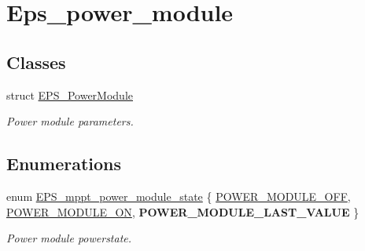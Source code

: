 \hypertarget{group__eps__power__module}{\section{Eps\-\_\-power\-\_\-module}
\label{group__eps__power__module}
}
\subsection*{Classes}
\begin{DoxyCompactItemize}
\item 
struct \hyperlink{struct_e_p_s___power_module}{E\-P\-S\-\_\-\-Power\-Module}
\begin{DoxyCompactList}\small\item\em Power module parameters. \end{DoxyCompactList}\end{DoxyCompactItemize}
\subsection*{Enumerations}
\begin{DoxyCompactItemize}
\item 
enum \hyperlink{group__eps__power__module_gadd75354311e873b06e0f85b643c5cea2}{E\-P\-S\-\_\-mppt\-\_\-power\-\_\-module\-\_\-state} \{ \hyperlink{group__eps__power__module_ggadd75354311e873b06e0f85b643c5cea2a736e356719d62059c975b07f1b4d24ef}{P\-O\-W\-E\-R\-\_\-\-M\-O\-D\-U\-L\-E\-\_\-\-O\-F\-F}, 
\hyperlink{group__eps__power__module_ggadd75354311e873b06e0f85b643c5cea2a577e74d24852a24295d63e50021704cd}{P\-O\-W\-E\-R\-\_\-\-M\-O\-D\-U\-L\-E\-\_\-\-O\-N}, 
{\bfseries P\-O\-W\-E\-R\-\_\-\-M\-O\-D\-U\-L\-E\-\_\-\-L\-A\-S\-T\-\_\-\-V\-A\-L\-U\-E}
 \}
\begin{DoxyCompactList}\small\item\em Power module powerstate. \end{DoxyCompactList}\end{DoxyCompactItemize}
